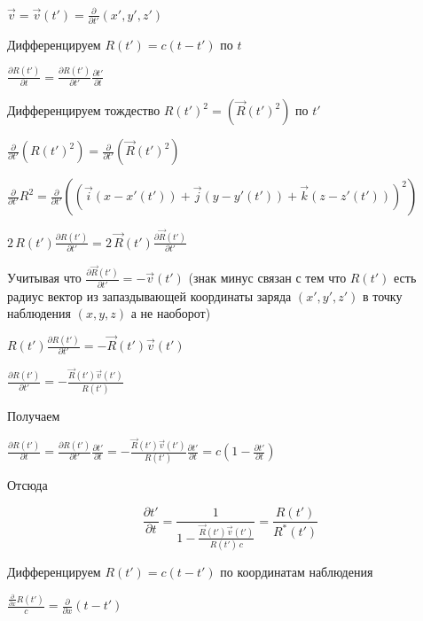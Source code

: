\documentclass[11pt]{article}
\begin{document}
\(\vec v = \vec v\left(t'\right) = \frac {\partial}{\partial t'}(x', y', z')\)

    Дифференцируем \(R\left(t'\right) = c \left(t-t'\right)\) по \(t\)

\(\frac{\partial R\left(t'\right)}{\partial t} = \frac{\partial R\left(t'\right)}{\partial t'} \frac{\partial t'}{\partial t}\)

    Дифференцируем тождество
\(R\left(t'\right)^2 = \left(\vec R\left(t'\right)^2\right)\) по \(t'\)

\(\frac{\partial}{\partial t'}\left(R\left(t'\right)^2\right) = \frac{\partial}{\partial t'} \left(\vec R\left(t'\right)^2\right)\)

    \(\frac{\partial}{\partial t'}R^2 = \frac{\partial}{\partial t'} \left(\left(\vec i \left(x-x'\left(t'\right)\right)  + \vec j \left(y-y'\left(t'\right)\right)  + \vec k \left(z-z'\left(t'\right)\right)\right)^2\right)\)

    \(2\,R\left(t'\right)\frac{\partial R\left(t'\right)}{\partial t'} = 2\,\vec R\left(t'\right)\frac{\partial \vec R\left(t'\right)}{\partial t'}\)

    Учитывая что
\(\frac{\partial \vec R\left(t'\right)}{\partial t'} = -\vec v\left(t'\right)\)
(знак минус связан с тем что \(R\left(t'\right)\) есть радиус вектор из
запаздывающей координаты заряда \((x', y', z')\) в точку наблюдения
\((x, y, z)\) а не наоборот)

    \(R\left(t'\right)\frac{\partial R\left(t'\right)}{\partial t'} = -\vec R\left(t'\right)\vec v\left(t'\right)\)

    \(\frac{\partial R\left(t'\right)}{\partial t'} = -\frac{\vec R\left(t'\right)\vec v\left(t'\right)}{R\left(t'\right)}\)

    Получаем

\(\frac{\partial R\left(t'\right)}{\partial t} = \frac{\partial R\left(t'\right)}{\partial t'} \frac{\partial t'}{\partial t} = -\frac{\vec R\left(t'\right)\vec v\left(t'\right)}{R\left(t'\right)} \frac{\partial t'}{\partial t} = c\left(1-\frac{\partial t'}{\partial t}\right)\)

Отсюда

\[\frac{\partial t'}{\partial t} = \frac{1}{1 -\frac{\vec R\left(t'\right)\vec v\left(t'\right)}{R\left(t'\right)\,c}} = \frac{R\left(t'\right)}{{{R}^{*}}\left(t'\right)}\]

    Дифференцируем \(R\left(t'\right) = c \left(t-t'\right)\) по координатам
наблюдения

\(\frac{\frac{\partial}{\partial x} R\left(t'\right)}{c} = \frac{\partial}{\partial x} \left(t-t'\right)\)
\end{document}
